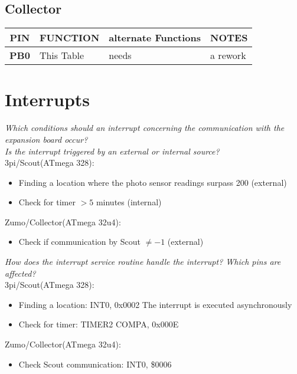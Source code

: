 \documentclass[12pt]{article}
\begin{document}
\subsection*{Collector}
\small
\begin{tabular}{c || p{30mm} | p{30mm} | p{60mm}}
  \hline
  \textbf{PIN} & FUNCTION & alternate Functions & NOTES\\
  \hline
  \textbf{PB0} & This Table & needs & a rework\\
  \hline
\end{tabular}
\normalsize

\section*{Interrupts}

\textit{Which conditions should an interrupt concerning the communication with the expansion board occur?} \\
\textit{Is the interrupt triggered by an external or internal source?} \\

3pi/Scout(ATmega 328): \\
\begin{itemize}
\item Finding a location where the photo sensor readings surpass 200 (external)
\item Check for timer $> 5$ minutes (internal)
\end{itemize}
Zumo/Collector(ATmega 32u4): \\
\begin{itemize}
\item Check if communication by Scout $\neq -1$ (external)
\end{itemize} 

\flushleft
\textit{How does the interrupt service routine handle the interrupt? Which pins are affected?} \\

3pi/Scout(ATmega 328): \\
\begin{itemize}
\item Finding a location: INT0, 0x0002
The interrupt is executed asynchronously 
\item Check for timer: TIMER2 COMPA, 0x000E 
\end{itemize}
Zumo/Collector(ATmega 32u4): \\
\begin{itemize}
\item Check Scout communication: INT0, \$0006
\end{itemize}
\end{document}
